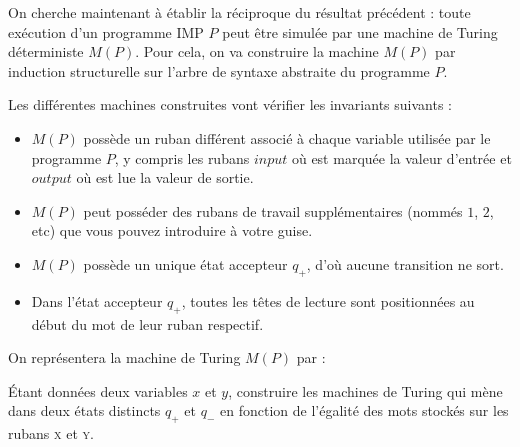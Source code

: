 \begin{exercice}
  On cherche maintenant à établir la réciproque du résultat précédent :
  toute exécution d’un programme IMP $P$ peut être simulée par une machine de Turing déterministe $M(P)$.
  Pour cela, on va construire la machine $M(P)$ par induction structurelle sur l'arbre de syntaxe abstraite du programme $P$.

  Les différentes machines construites vont vérifier les invariants suivants :
  
  \begin{itemize}
  \item $M(P)$ possède un ruban différent associé à chaque variable utilisée par le programme $P$,
    y compris les rubans $\mathit{input}$ où est marquée la valeur d'entrée et $\mathit{output}$
    où est lue la valeur de sortie.
  \item
    $M(P)$ peut posséder des rubans de travail supplémentaires (nommés $1$, $2$, etc) que vous pouvez introduire à votre guise.
  \item $M(P)$ possède un unique état accepteur $q_+$, d'où aucune transition ne sort. 
  \item Dans l'état accepteur $q_+$, toutes les têtes de lecture sont positionnées au début du mot de leur ruban respectif.
  \end{itemize}
  
  On représentera la machine de Turing $M(P)$ par : 


  \begin{questions}
  \item Étant données deux variables $x$ et $y$, construire les machines
    de Turing qui mène dans deux états distincts $q_+$ et $q_-$
    en fonction de l'égalité des mots stockés sur les rubans
    \textsc{x} et \textsc{y}.
  \end{questions}
  \begin{corrections}
    \vspace{-4mm}
\end{corrections}
\end{exercice}
